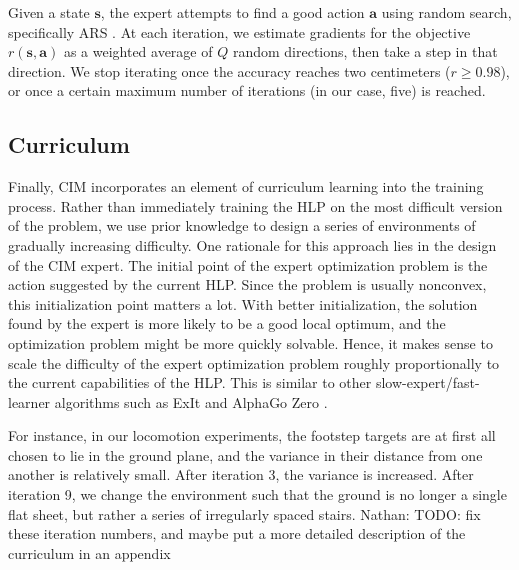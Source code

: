 \documentclass[conference]{IEEEtran}
\newcommand{\nhatch}[1]{{\leavevmode\color{magenta} Nathan: #1}}
\begin{document}
Given a state $\mathbf{s}$, the expert attempts to find a good action $\mathbf{a}$ using random search, specifically ARS \citep{mania2018simple}.
At each iteration, we estimate gradients for the objective $r(\mathbf s, \mathbf a)$ as a weighted average of $Q$ random directions, then take a step in that direction.
We stop iterating once the accuracy reaches two centimeters ($r \geq 0.98$), or once a certain maximum number of iterations (in our case, five) is reached.


\subsection{Curriculum} \label{sec:curriculum}

Finally, CIM incorporates an element of curriculum learning into the training process.
Rather than immediately training the HLP on the most difficult version of the problem,
we use prior knowledge to design a series of environments of gradually increasing difficulty.
One rationale for this approach lies in the design of the CIM expert.
The initial point of the expert optimization problem is the action suggested by the current HLP.
Since the problem is usually nonconvex, this initialization point matters a lot.
With better initialization, the solution found by the expert is more likely to be a good local optimum, and the optimization problem might be more quickly solvable.
Hence, it makes sense to scale the difficulty of the expert optimization problem roughly proportionally to the current capabilities of the HLP.
This is similar to other slow-expert/fast-learner algorithms such as ExIt \citep{anthony2017thinking} and AlphaGo Zero \citep{silver2017mastering}.

For instance, in our locomotion experiments, the footstep targets are at first all chosen to lie in the ground plane, and the variance in their distance from one another is relatively small.
After iteration 3, the variance is increased.
After iteration 9, we change the environment such that the ground is no longer a single flat sheet, but rather a series of irregularly spaced stairs.
\nhatch{TODO: fix these iteration numbers, and maybe put a more detailed description of the curriculum in an appendix}

\end{document}
